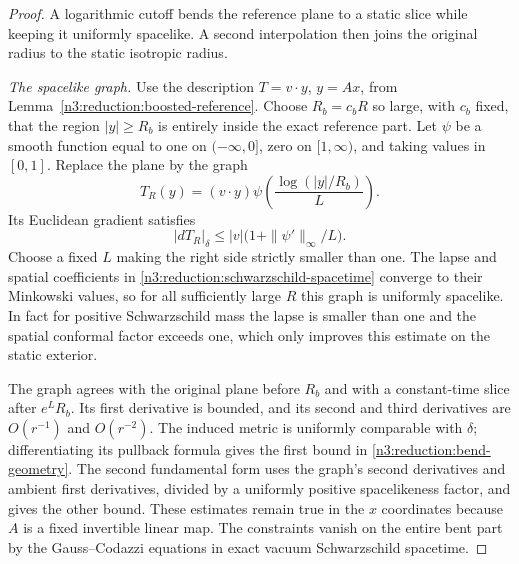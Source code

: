 \begin{proof}
A logarithmic cutoff bends the reference plane to a static slice while
keeping it uniformly spacelike. A second interpolation then joins the
original radius to the static isotropic radius.

\emph{The spacelike graph.} Use the description $T=v\cdot y$, $y=Ax$, from
Lemma~\ref{n3:reduction:boosted-reference}.  Choose $R_b=c_bR$ so large,
with $c_b$ fixed, that the region $|y|\ge R_b$ is entirely inside the
exact reference part.  Let $\psi$ be a smooth function equal to one on
$(-\infty,0]$, zero on $[1,\infty)$, and taking values in $[0,1]$.
Replace the plane by the graph
\begin{equation}
 \label{n3:reduction:bending-graph}
 T_R(y)=(v\cdot y)
           \psi\left(\frac{\log(|y|/R_b)}{L}\right).
\end{equation}
Its Euclidean gradient satisfies
\[
 |dT_R|_\delta\le |v|\bigl(1+\|\psi'\|_\infty/L\bigr).
\]
Choose a fixed $L$ making the right side strictly smaller than one.
The lapse and spatial coefficients in
\eqref{n3:reduction:schwarzschild-spacetime} converge to their
Minkowski values, so for all sufficiently large $R$ this graph is
uniformly spacelike.  In fact for positive Schwarzschild mass the lapse
is smaller than one and the spatial conformal factor exceeds one,
which only improves this estimate on the static exterior.

The graph agrees with the original plane before $R_b$ and with a
constant-time slice after $e^LR_b$.  Its first derivative is bounded,
and its second and third derivatives are $O(r^{-1})$ and $O(r^{-2})$.
The induced metric is uniformly comparable with $\delta$; differentiating
its pullback formula gives the first bound in
\eqref{n3:reduction:bend-geometry}.  The second fundamental form
uses the graph's second derivatives and ambient first derivatives,
divided by a uniformly positive spacelikeness factor, and gives the
other bound.  These estimates remain true in the $x$ coordinates because
$A$ is a fixed invertible linear map.  The constraints vanish on the
entire bent part by the Gauss--Codazzi equations in exact vacuum
Schwarzschild spacetime.


\end{proof}
